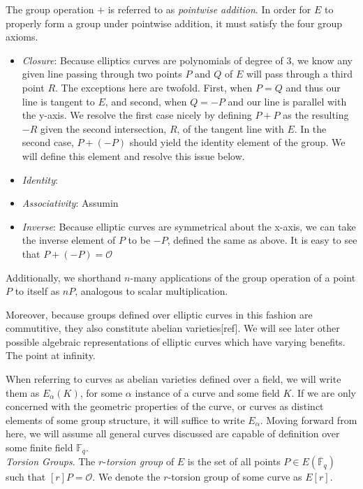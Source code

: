 The group operation $+$ is referred to as \emph{pointwise addition}. In order for $E$ to properly form a group under pointwise addition, it must satisfy the four group axioms.
\begin{itemize}
\item \emph{Closure}: Because elliptics curves are polynomials of degree of 3, we know any given line passing through two points $P$ and $Q$ of $E$ will pass through a third point $R$. The exceptions here are twofold. First, when $P = Q$ and thus our line is tangent to $E$, and second, when $Q = -P$ and our line is parallel with the y-axis. We resolve the first case nicely by defining $P + P$ as the resulting $-R$ given the second intersection, $R$, of the tangent line with $E$. In the second case, $P + (-P)$ should yield the identity element of the group. We will define this element and resolve this issue below.  
\item \emph{Identity}:
\item \emph{Associativity}: Assumin
\item \emph{Inverse}: Because elliptic curves are symmetrical about the x-axis, we can take the inverse element of $P$ to be $-P$, defined the same as above. It is easy to see that $P+(-P) = \mathcal{O}$
\end{itemize}

Additionally, we shorthand $n$-many applications of the group operation of a point $P$ to itself as $nP$, analogous to scalar multiplication. 

Moreover, because groups defined over elliptic curves in this fashion are commutitive, they also constitute abelian varieties[ref]. We will see later other possible algebraic representations of elliptic curves which have varying benefits.
The point at infinity.

When referring to curves as abelian varieties defined over a field, we will write them as $E_{\alpha}(K)$, for some $\alpha$ instance of a curve and some field $K$. If we are only concerned with the geometric properties of the curve, or curves as distinct elements of some group structure, it will suffice to write $E_{\alpha}$. Moving forward from here, we will assume all general curves discussed are capable of definition over some finite field $\mathbb{F}_q$.\\

\noindent
\emph{Torsion Groups}. The $r$-\emph{torsion group} of $E$ is the set of all points $P \in E(\overline{\mathbb{F}}_q)$ such that $[r]P = \mathcal{O}$. We denote the $r$-torsion group of some curve as $E[r]$.

